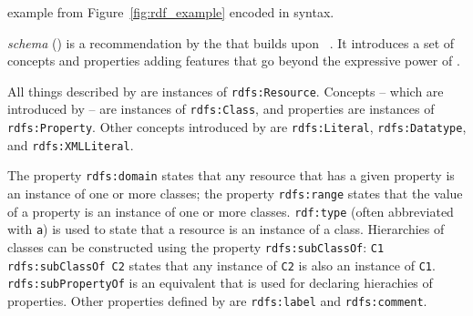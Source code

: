 \begin{mintlisting}

\caption[ example in \emph{Turtle} syntax]{ example from Figure~\ref{fig:rdf_example} encoded in  syntax.}
\label{listing:turtle_example}
\end{mintlisting}

\vspace{1em}

 \emph{schema} () is a recommendation by the  that builds upon ~\cite{RDFS}. It introduces a set of concepts and properties adding features that go beyond the expressive power of .

All things described by  are instances of \texttt{rdfs:Resource}. Concepts -- which are introduced by  -- are instances of \texttt{rdfs:Class}, and properties are instances of \texttt{rdfs:\hspace{0pt}Property}. Other concepts introduced by  are \texttt{rdfs:\hspace{0pt}Literal}, \texttt{rdfs:\hspace{0pt}Datatype}, and \texttt{rdfs:\hspace{0pt}XMLLiteral}.

The property \texttt{rdfs:domain} states that any resource that has a given property is an instance of one or more classes; the property \texttt{rdfs:range} states that the value of a property is an instance of one or more classes. \texttt{rdf:type} (often abbreviated with \texttt{a}) is used to state that a resource is an instance of a class. Hierarchies of classes can be constructed using the property \texttt{rdfs:subClassOf}: \texttt{C1 rdfs:subClassOf C2} states that any instance of \texttt{C2} is also an instance of \texttt{C1}. \texttt{rdfs:subPropertyOf} is an equivalent that is used for declaring hierachies of properties. Other properties defined by  are \texttt{rdfs:label} and \texttt{rdfs:comment}.


